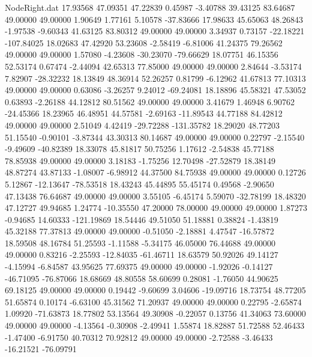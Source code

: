 \begin{filecontents}{NodeRight.dat}
  17.93568   47.09351   47.22839     0.45987   -3.40788   39.43125   83.64687   49.00000   49.00000    1.90649    1.77161    5.10578  -37.83666
  17.98633   45.65063   48.26843    -1.97538   -9.60343   41.63125   83.80312   49.00000   49.00000    3.34937    0.73157  -22.18221 -107.84025
  18.02683   47.42920   53.23608    -2.58419   -6.81006   41.24375   79.26562   49.00000   49.00000    1.57080   -4.23608  -30.23070  -79.66629
  18.07751   46.15356   52.53174     0.67474   -2.44094   42.65313   77.85000   49.00000   49.00000    2.84644   -3.53174    7.82907  -28.32232
  18.13849   48.36914   52.26257     0.81799   -6.12962   41.67813   77.10313   49.00000   49.00000    0.63086   -3.26257    9.24012  -69.24081
  18.18896   45.58321   47.53052     0.63893   -2.26188   44.12812   80.51562   49.00000   49.00000    3.41679    1.46948    6.90762  -24.45366
  18.23965   46.48951   44.57581    -2.69163  -11.89543   44.77188   84.42812   49.00000   49.00000    2.51049    4.42419  -29.72288 -131.35782
  18.29020   48.77203   51.15540    -0.90101   -3.87344   43.30313   80.14687   49.00000   49.00000    0.22797   -2.15540   -9.49609  -40.82389
  18.33078   45.81817   50.75256     1.17612   -2.54838   45.77188   78.85938   49.00000   49.00000    3.18183   -1.75256   12.70498  -27.52879
  18.38149   48.87274   43.87133    -1.08007   -6.98912   44.37500   84.75938   49.00000   49.00000    0.12726    5.12867  -12.13647  -78.53518
  18.43243   45.44895   55.45174     0.49568   -2.90650   47.13438   76.64687   49.00000   49.00000    3.55105   -6.45174    5.59070  -32.78199
  18.48320   47.12727   49.94685     1.24774  -10.35550   47.20000   78.00000   49.00000   49.00000    1.87273   -0.94685   14.60333 -121.19869
  18.54446   49.51050   51.18881     0.38824   -1.43819   45.32188   77.37813   49.00000   49.00000   -0.51050   -2.18881    4.47547  -16.57872
  18.59508   48.16784   51.25593    -1.11588   -5.34175   46.05000   76.44688   49.00000   49.00000    0.83216   -2.25593  -12.84035  -61.46711
  18.63579   50.92026   49.14127    -4.15994   -6.84587   43.95625   77.69375   49.00000   49.00000   -1.92026   -0.14127  -46.71095  -76.87066
  18.68669   48.80558   58.60699     0.28081   -1.76050   44.90625   69.18125   49.00000   49.00000    0.19442   -9.60699    3.04606  -19.09716
  18.73754   48.77205   51.65874     0.10174   -6.63100   45.31562   71.20937   49.00000   49.00000    0.22795   -2.65874    1.09920  -71.63873
  18.77802   53.13564   49.30908    -0.22057    0.13756   41.34063   73.60000   49.00000   49.00000   -4.13564   -0.30908   -2.49941    1.55874
  18.82887   51.72588   52.46433    -1.47400   -6.91750   40.70312   70.92812   49.00000   49.00000   -2.72588   -3.46433  -16.21521  -76.09791

\end{filecontents}
